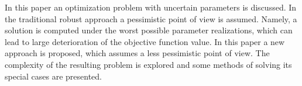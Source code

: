 
In this paper an optimization problem with uncertain parameters is discussed. In the traditional robust approach a pessimistic point of view is assumed. Namely, a solution is computed under the worst possible parameter realizations, which can lead to large deterioration of the objective  function value. In this paper a new approach is proposed, which assumes a less pessimistic point of view.  The complexity of the resulting problem is explored and some methods of solving its special cases are presented.

